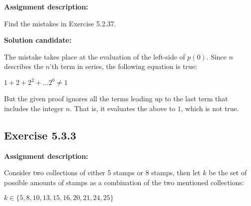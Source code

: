 \documentclass{report}
\newcommand{\cent}[1]{\begin{center}#1\end{center}}
\newcommand{\In}{\! \in \!}
\newcommand{\AssignmentDescription}{\textbf{Assignment description: }}
\newcommand{\Solution}{\textbf{Solution candidate: }}
\newcommand{\QED}{\boxed{}}
\newcommand{\Exercise}[1]{\subsection{Exercise #1}}
\begin{document}
 	\AssignmentDescription
 	
 	Find the mistakes in Exercise 5.2.37.
 	
 	\Solution
 	
 	The mistake takes place at the evaluation of the left-side of $p(0)$. Since $n$ describes the $n$'th term in series, the following equation is true:
 	
 	\cent{$ 1+ 2 + 2^2 + \dots 2^0 \neq 1 $}
 	
 	But the given proof ignores all the terms leading up to the last term that includes the integer $n$. That is, it evaluates the above to $1$, which is not true. \\
 	
 	\QED
 	
 	\Exercise{5.3.3}
 	\AssignmentDescription
 	
 	Consider two collections of either 5 stamps or 8 stamps, then let $k$ be the set of possible amounts of stamps as a combination of the two mentioned collections:
 	
 	\cent{$k \In \{5,8,10,13,15,16,20,21,24,25\}$}
 	
\end{document}
